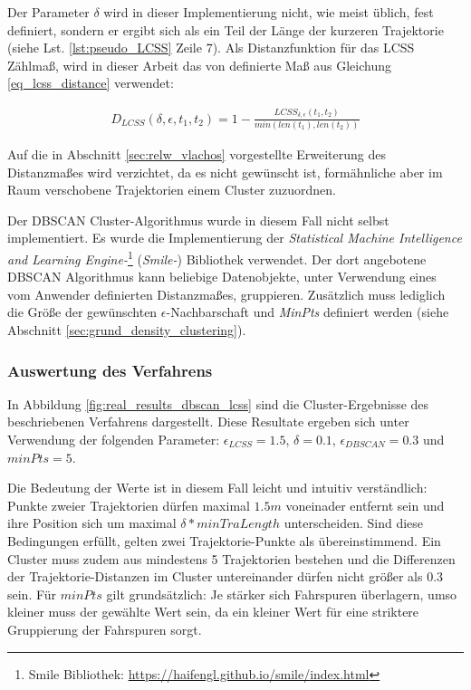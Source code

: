 Der Parameter $\delta$ wird in dieser Implementierung nicht, wie meist üblich, fest definiert, sondern er ergibt sich als
ein Teil der Länge der kurzeren Trajektorie (siehe Lst. \ref{lst:pseudo_LCSS} Zeile 7).
Als Distanzfunktion für das LCSS Zählmaß, wird in dieser Arbeit das von \cite[]{Vlachos2002} definierte
Maß aus Gleichung \ref{eq_lcss_distance} verwendet:

\begin{ceqn}
\begin{align*}
    D_{LCSS}(\delta, \epsilon, t_1, t_2) = 1 - \frac{LCSS_{\delta, \epsilon}(t_1, t_2)}{min(len(t_1), len(t_2))}
\end{align*}
\end{ceqn}

Auf die in Abschnitt \ref{sec:relw_vlachos} vorgestellte Erweiterung des Distanzmaßes wird verzichtet,
da es nicht gewünscht ist, formähnliche aber im Raum verschobene Trajektorien einem Cluster zuzuordnen.

Der DBSCAN Cluster-Algorithmus wurde in diesem Fall nicht selbst implementiert. Es wurde die Implementierung
der \textit{Statistical Machine Intelligence and Learning Engine-}\footnote{Smile Bibliothek: \url{https://haifengl.github.io/smile/index.html}}
(\textit{Smile-}) Bibliothek verwendet. Der dort angebotene DBSCAN Algorithmus kann beliebige Datenobjekte, unter Verwendung eines
vom Anwender definierten Distanzmaßes, gruppieren. Zusätzlich muss lediglich die Größe der gewünschten
$\epsilon$-Nachbarschaft und \textit{MinPts} definiert werden (siehe Abschnitt \ref{sec:grund_density_clustering}).

\subsubsection{Auswertung des Verfahrens}
\label{sec:results_clustering_dbscan_lcss}

In Abbildung \ref{fig:real_results_dbscan_lcss} sind die Cluster-Ergebnisse des beschriebenen Verfahrens
dargestellt. Diese Resultate ergeben sich unter Verwendung der folgenden Parameter:
$\epsilon_{LCSS} = 1.5$, $\delta = 0.1$, $\epsilon_{DBSCAN} = 0.3$ und $minPts = 5$.

Die Bedeutung der Werte ist in diesem Fall leicht und intuitiv verständlich: Punkte zweier Trajektorien
dürfen maximal $1.5m$ voneinader entfernt sein und ihre Position sich um maximal $\delta * minTraLength$ unterscheiden.
Sind diese Bedingungen erfüllt, gelten zwei Trajektorie-Punkte als übereinstimmend. Ein Cluster muss zudem aus mindestens
5 Trajektorien bestehen und die Differenzen der Trajektorie-Distanzen im Cluster untereinander dürfen nicht größer als 0.3 sein.
Für $minPts$ gilt grundsätzlich: Je stärker sich Fahrspuren überlagern, umso kleiner muss der gewählte Wert sein, da
ein kleiner Wert für eine striktere Gruppierung der Fahrspuren sorgt.  

